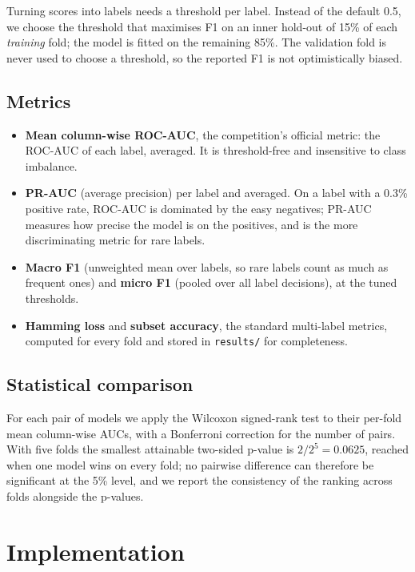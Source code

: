 \documentclass[11pt,a4paper]{article}
\begin{document}
Turning scores into labels needs a threshold per label.  Instead of the default
0.5, we choose the threshold that maximises F1 on an inner hold-out of 15\% of
each \emph{training} fold; the model is fitted on the remaining 85\%.  The
validation fold is never used to choose a threshold, so the reported F1 is not
optimistically biased.

\subsection{Metrics}

\begin{itemize}
  \item \textbf{Mean column-wise ROC-AUC}, the competition's official metric:
        the ROC-AUC of each label, averaged.  It is threshold-free and
        insensitive to class imbalance.
  \item \textbf{PR-AUC} (average precision) per label and averaged.  On a label
        with a 0.3\% positive rate, ROC-AUC is dominated by the easy negatives;
        PR-AUC measures how precise the model is on the positives, and is the
        more discriminating metric for rare labels.
  \item \textbf{Macro F1} (unweighted mean over labels, so rare labels count as
        much as frequent ones) and \textbf{micro F1} (pooled over all
        label decisions), at the tuned thresholds.
  \item \textbf{Hamming loss} and \textbf{subset accuracy}, the standard
        multi-label metrics, computed for every fold and stored in
        \texttt{results/} for completeness.
\end{itemize}

\subsection{Statistical comparison}

For each pair of models we apply the Wilcoxon signed-rank test to their
per-fold mean column-wise AUCs, with a Bonferroni correction for the number of
pairs.  With five folds the smallest attainable two-sided p-value is
$2/2^5 = 0.0625$, reached when one model wins on every fold; no pairwise
difference can therefore be significant at the 5\% level, and we report the
consistency of the ranking across folds alongside the p-values.

\section{Implementation}
\end{document}

